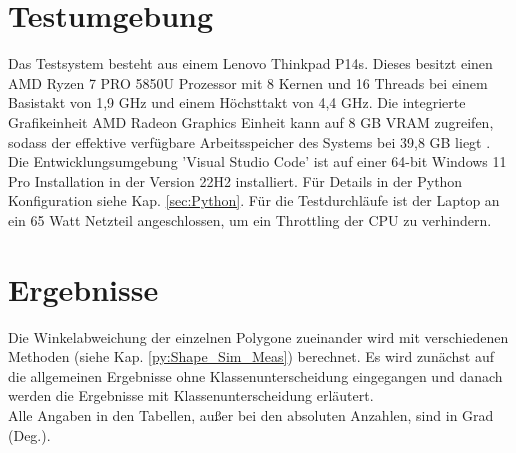 \section{Testumgebung}{
	Das Testsystem besteht aus einem Lenovo Thinkpad P14s. Dieses besitzt einen AMD Ryzen 7 PRO 5850U Prozessor mit 8 Kernen und 16 Threads bei einem Basistakt von 1,9 GHz und einem Höchsttakt von 4,4 GHz. Die integrierte Grafikeinheit AMD Radeon Graphics Einheit kann auf 8 GB VRAM zugreifen, sodass der effektive verfügbare Arbeitsspeicher des Systems bei 39,8 GB liegt \citep{PSREF21}. Die Entwicklungsumgebung 'Visual Studio Code' ist auf einer 64-bit Windows 11 Pro Installation in der Version 22H2 installiert. Für Details in der Python Konfiguration siehe Kap. \ref{sec:Python}. Für die Testdurchläufe ist der Laptop an ein 65 Watt Netzteil angeschlossen, um ein Throttling der CPU zu verhindern.
}
\section{Ergebnisse}
{ Die Winkelabweichung der einzelnen Polygone zueinander wird mit verschiedenen Methoden  (siehe Kap. \ref{py:Shape_Sim_Meas}) berechnet. Es wird zunächst auf die allgemeinen Ergebnisse ohne Klassenunterscheidung eingegangen und danach werden die Ergebnisse mit Klassenunterscheidung erläutert.\\
Alle Angaben in den Tabellen, außer bei den absoluten Anzahlen, sind in Grad (Deg.).}
